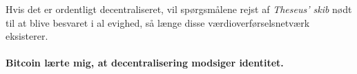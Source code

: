 Hvis det er ordentligt decentraliseret, vil spørgsmålene rejst af 
\textit{Theseus' skib} nødt til at blive besvaret i al evighed, så længe disse 
værdioverførselsnetværk eksisterer.

\paragraph{Bitcoin lærte mig, at decentralisering modsiger identitet.}

%
%
%
%
